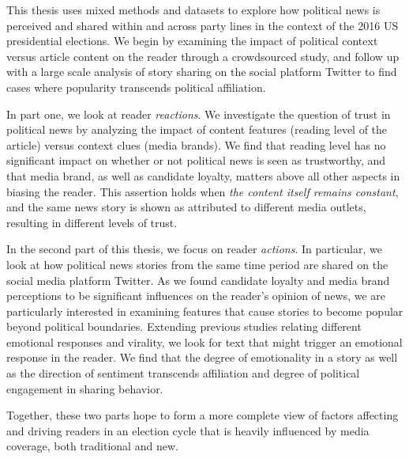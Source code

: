 \def\abstractpage{\cleardoublepage
\begin{center}{\large{\bf \@title} \\
by \\
\@author \\[\baselineskip]}
\par
\def\baselinestretch{1}\@normalsize
Submitted to the \@department, \\
\@school \\
on \@thesisdate, in partial fulfillment of the \\
requirements for the \@degreeword\ of \\
\@degree
\end{center}
\par
\begin{abstract}}
This thesis uses mixed methods and datasets to explore how political news is perceived and shared within and across party lines in the context of the 2016 US presidential elections. We begin by examining the impact of political context versus article content on the reader through a crowdsourced study, and follow up with a large scale analysis of story sharing on the social platform Twitter to find cases where popularity transcends political affiliation.
 
In part one, we look at reader \emph{reactions}. We investigate the question of trust in political news by analyzing the impact of content features (reading level of the article) versus context clues (media brands). We find that reading level has no significant impact on whether or not political news is seen as trustworthy, and that media brand, as well as candidate loyalty, matters above all other aspects in biasing the reader. This assertion holds when \emph{the content itself remains constant}, and the same news story is shown as attributed to different media outlets, resulting in different levels of trust. 

In the second part of this thesis, we focus on reader \emph{actions}.  In particular, we look at how political news stories from the same time period are shared on the social media platform Twitter. As we found candidate loyalty and media brand perceptions to be significant influences on the reader's opinion of news, we are particularly interested in examining features that cause stories to become popular beyond political boundaries. Extending previous studies relating different emotional responses and virality, we look for text that might trigger an emotional response in the reader. We find that the degree of emotionality in a story as well as the direction of sentiment transcends affiliation and degree of political engagement in sharing behavior. 

Together, these two parts hope to form a more complete view of factors affecting and driving readers in an election cycle that is heavily influenced by media coverage, both traditional and new.





\afterpage{\blankpage}

 